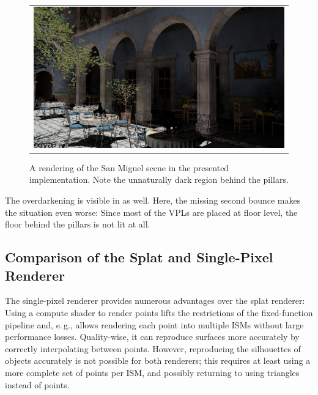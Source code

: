 \begin{figure}[htb]
\centering
  \begin{tabular}{@{}c@{}}
    \includegraphics[width=1.0\textwidth]{screenshots/san_miguel_wide} \\
  \end{tabular}
  \caption{A rendering of the San Miguel scene in the presented implementation. Note the unnaturally dark region behind the pillars. \vspace{-0.25cm}}
  \label{fig:results:san_miguel_wide}
\end{figure}

\pagebreak
\noindent
The overdarkening is visible in  as well. Here, the missing second bounce makes the situation even worse: Since most of the VPLs are placed at floor level, the floor behind the pillars is not lit at all.

\vspace{5pt}

\subsection{Comparison of the Splat and Single-Pixel Renderer}
\label{sec:results:ism:comparison}

The single-pixel renderer provides numerous advantages over the splat renderer: Using a compute shader to render points lifts the restrictions of the fixed-function pipeline and, e.\,g., allows rendering each point into multiple ISMs without large performance losses. Quality-wise, it can reproduce surfaces more accurately by correctly interpolating between points. However, reproducing the silhouettes of objects accurately is not possible for both renderers; this requires at least using a more complete set of points per ISM, and possibly returning to using triangles instead of points.

